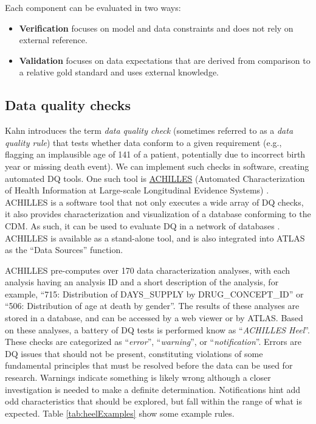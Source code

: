 \documentclass[11pt]{book}
\providecommand{\tightlist}{%
  \setlength{\itemsep}{0pt}\setlength{\parskip}{0pt}}
\theoremstyle{definition}
\theoremstyle{definition}
\theoremstyle{definition}
\theoremstyle{remark}
\begin{document}
Each component can be evaluated in two ways:

\begin{itemize}
\tightlist
\item
  \textbf{Verification} focuses on model and data constraints and does not rely on external reference.
\item
  \textbf{Validation} focuses on data expectations that are derived from comparison to a relative gold standard and uses external knowledge.
\end{itemize}

 

\hypertarget{data-quality-checks}{%
\subsection{Data quality checks}\label{data-quality-checks}}

Kahn introduces the term \emph{data quality check} (sometimes referred to as a \emph{data quality rule}) that tests whether data conform to a given requirement (e.g., flagging an implausible age of 141 of a patient, potentially due to incorrect birth year or missing death event). We can implement such checks in software, creating automated DQ tools. One such tool is \href{https://github.com/OHDSI/Achilles}{ACHILLES} (Automated Characterization of Health Information at Large-scale Longitudinal Evidence Systems) \citep{huser_methods_2018}. ACHILLES is a software tool that not only executes a wide array of DQ checks, it also provides characterization and visualization of a database conforming to the CDM. As such, it can be used to evaluate DQ in a network of databases \citep{huser_multisite_2016}. ACHILLES is available as a stand-alone tool, and is also integrated into ATLAS as the ``Data Sources'' function.  

ACHILLES pre-computes over 170 data characterization analyses, with each analysis having an analysis ID and a short description of the analysis, for example, ``715: Distribution of DAYS\_SUPPLY by DRUG\_CONCEPT\_ID'' or ``506: Distribution of age at death by gender''. The results of these analyses are stored in a database, and can be accessed by a web viewer or by ATLAS. Based on these analyses, a battery of DQ tests is performed know as ``\emph{ACHILLES Heel}''. These checks are categorized as ``\emph{error}'', ``\emph{warning}'', or ``\emph{notification}''. Errors are DQ issues that should not be present, constituting violations of some fundamental principles that must be resolved before the data can be used for research. Warnings indicate something is likely wrong although a closer investigation is needed to make a definite determination. Notifications hint add odd characteristics that should be explored, but fall within the range of what is expected. Table \ref{tab:heelExamples} show some example rules. 
\end{document}
